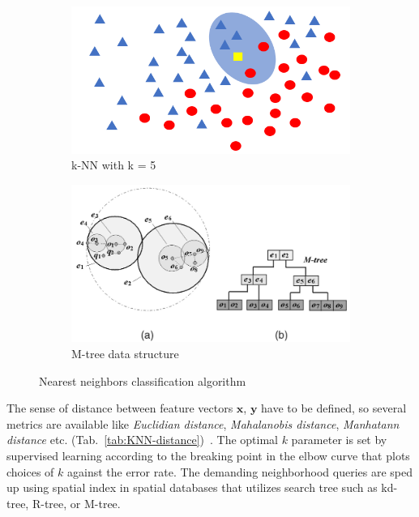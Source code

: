 \begin{figure}[ht]
    \centering
    \begin{subfigure}[b]{0.49\textwidth}
        \includegraphics[width=\textwidth]{assets/analysis/KNN.png}
        \caption{k-NN with k = 5}
        \label{fig:KNN}
    \end{subfigure}
    \hfill
    \begin{subfigure}[b]{0.49\textwidth}
        \includegraphics[width=\textwidth]{assets/analysis/M-tree.png}
        \caption{M-tree data structure}
        \label{fig:m-tree}
    \end{subfigure}
    \caption{Nearest neighbors classification algorithm~\cite{chen_skyline_2009}}
\end{figure}

The sense of distance between feature vectors $\mathbf{x}$, $\mathbf{y}$ have to be defined, so several metrics are available like \emph{Euclidian distance}, \emph{Mahalanobis distance}, \emph{Manhatann distance} etc. (Tab.~\ref{tab:KNN-distance})~\cite{sheng_review_2020, abu_alfeilat_effects_2019}. The optimal $k$ parameter is set by supervised learning according to the breaking point in the elbow curve that plots choices of $k$ against the error rate. The demanding neighborhood queries are sped up using spatial index in spatial databases that utilizes search tree such as kd-tree, R-tree, or M-tree.

